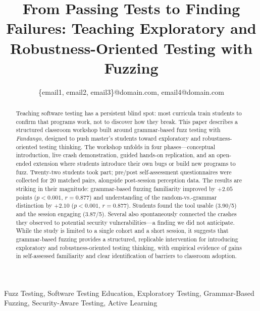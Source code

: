 \documentclass[conference]{IEEEtran}
\begin{document}
\title{From Passing Tests to Finding Failures: Teaching Exploratory and Robustness-Oriented Testing with Fuzzing}

\author{
\{email1, email2, email3\}@domain.com, email4@domain.com
}

\maketitle

\begin{abstract}
Teaching software testing has a persistent blind spot: most curricula train students to confirm that programs work, not to discover how they break.
This paper describes a structured classroom workshop built around grammar-based fuzz testing with \emph{Fandango}, designed to push master's students toward exploratory and robustness-oriented testing thinking.
The workshop unfolds in four phases---conceptual introduction, live crash demonstration, guided hands-on replication, and an open-ended extension where students introduce their own bugs or build new programs to fuzz.
Twenty-two students took part; pre/post self-assessment questionnaires were collected for 20 matched pairs, alongside post-session perception data.
The results are striking in their magnitude: grammar-based fuzzing familiarity improved by $+2.05$ points ($p < 0.001$, $r = 0.877$) and understanding of the random-vs.-grammar distinction by $+2.10$ ($p < 0.001$, $r = 0.877$).
Students found the tool usable (3.90/5) and the session engaging (3.87/5).
Several also spontaneously connected the crashes they observed to potential security vulnerabilities---a finding we did not anticipate.
While the study is limited to a single cohort and a short session, it suggests that grammar-based fuzzing provides a structured, replicable intervention for introducing exploratory and robustness-oriented testing thinking, with empirical evidence of gains in self-assessed familiarity and clear identification of barriers to classroom adoption.
\end{abstract}

\begin{IEEEkeywords}
Fuzz Testing, Software Testing Education, Exploratory Testing, Grammar-Based Fuzzing, Security-Aware Testing, Active Learning
\end{IEEEkeywords}
\end{document}
